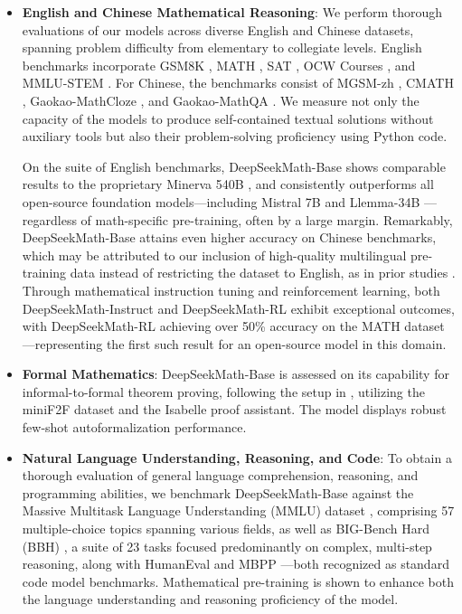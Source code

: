 \begin{itemize}[topsep=0pt]
    \item \textbf{English and Chinese Mathematical Reasoning}: We perform thorough evaluations of our models across diverse English and Chinese datasets, spanning problem difficulty from elementary to collegiate levels. English benchmarks incorporate GSM8K \citep{gsm8k}, MATH \citep{MATH}, SAT \citep{llemma}, OCW Courses \citep{minerva}, and MMLU-STEM \citep{mmlu}. For Chinese, the benchmarks consist of MGSM-zh \citep{mgsm}, CMATH \citep{wei2023cmath}, Gaokao-MathCloze \citep{agieval}, and Gaokao-MathQA \citep{agieval}. We measure not only the capacity of the models to produce self-contained textual solutions without auxiliary tools but also their problem-solving proficiency using Python code.

    On the suite of English benchmarks, DeepSeekMath-Base shows comparable results to the proprietary Minerva 540B \citep{minerva}, and consistently outperforms all open-source foundation models—including Mistral 7B \citep{mistral} and Llemma-34B \citep{llemma}—regardless of math-specific pre-training, often by a large margin. Remarkably, DeepSeekMath-Base attains even higher accuracy on Chinese benchmarks, which may be attributed to our inclusion of high-quality multilingual pre-training data instead of restricting the dataset to English, as in prior studies \citep{minerva,llemma}. Through mathematical instruction tuning and reinforcement learning, both DeepSeekMath-Instruct and DeepSeekMath-RL exhibit exceptional outcomes, with DeepSeekMath-RL achieving over 50\% accuracy on the MATH dataset—representing the first such result for an open-source model in this domain.

\item \textbf{Formal Mathematics}: DeepSeekMath-Base is assessed on its capability for informal-to-formal theorem proving, following the setup in \citep{dsp_proof}, utilizing the miniF2F \citep{minif2f} dataset and the Isabelle \citep{isabelle} proof assistant. The model displays robust few-shot autoformalization performance.
\item \textbf{Natural Language Understanding, Reasoning, and Code}: To obtain a thorough evaluation of general language comprehension, reasoning, and programming abilities, we benchmark DeepSeekMath-Base against the Massive Multitask Language Understanding (MMLU) dataset \citep{mmlu}, comprising 57 multiple-choice topics spanning various fields, as well as BIG-Bench Hard (BBH) \citep{bbh}, a suite of 23 tasks focused predominantly on complex, multi-step reasoning, along with HumanEval \citep{codex} and MBPP \citep{mbpp}—both recognized as standard code model benchmarks. Mathematical pre-training is shown to enhance both the language understanding and reasoning proficiency of the model.
\end{itemize}

